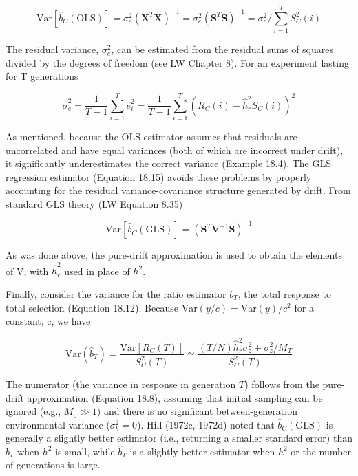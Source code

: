 \documentclass{article}
\begin{document}
\begin{equation}
\mathrm{Var}\left[\widehat{b}_{C}(\mathrm{OLS})\right]=\sigma_{e}^{2}\left(\mathbf{X}^{T}\mathbf{X}\right)^{-1}=\sigma_{e}^{2}\left(\mathbf{S}^{T}\mathbf{S}\right)^{-1}=\sigma_{e}^{2}\bigg/\sum_{i=1}^{T}S_{C}^{2}(i)
\tag{18.16a}
\label{eq:18_16a}
\end{equation}

The residual variance,  $ \sigma_{e}^{2} $, can be estimated from the residual sums of squares divided by the degrees of freedom (see LW Chapter 8). For an experiment lasting for T generations

\begin{equation}
\widehat{\sigma}_{e}^{2}=\frac{1}{T-1}\sum_{i=1}^{T}\widehat{e}_{i}^{2}=\frac{1}{T-1}\sum_{i=1}^{T}\left(R_{C}(i)-\widehat{h}_{r}^{2}S_{C}(i)\right)^{2}
\tag{18.16b}
\label{eq:18_16b}
\end{equation}

As mentioned, because the OLS estimator assumes that residuals are uncorrelated and have equal variances (both of which are incorrect under drift), it significantly underestimates the correct variance (Example 18.4). The GLS regression estimator (Equation 18.15) avoids these problems by properly accounting for the residual variance-covariance structure generated by drift. From standard GLS theory (LW Equation 8.35)

\begin{equation}
\mathrm{Var}\left[\widehat{b}_{C}(\mathrm{GLS})\right]=(\mathbf{S}^{T}\mathbf{V}^{-1}\mathbf{S})^{-1}
\tag{18.17}
\label{eq:18_17}
\end{equation}

As was done above, the pure-drift approximation is used to obtain the elements of V, with  $ \widehat{h}_{r}^{2} $ used in place of  $ h^{2} $.

Finally, consider the variance for the ratio estimator  $ b_T $, the total response to total selection (Equation 18.12). Because  $ \text{Var}(y/c) = \text{Var}(y)/c^2 $ for a constant, c, we have

\begin{equation}
\mathrm{Var}(\widehat{b}_{T})=\frac{\mathrm{Var}\left[R_{C}(T)\right]}{S_{C}^{2}(T)}\simeq\frac{(T/N)\widehat{h}_{r}^{2}\sigma_{z}^{2}+\sigma_{z}^{2}/M_{T}}{S_{C}^{2}(T)}
\tag{18.18}
\label{eq:18_18}
\end{equation}

The numerator (the variance in response in generation $T$) follows from the pure-drift approximation (Equation 18.8), assuming that initial sampling can be ignored (e.g., $M_0 \gg 1$) and there is no significant between-generation environmental variance ($\sigma_b^2 = 0$). Hill (1972c, 1972d) noted that $\widehat{b}_C(\mathrm{GLS})$ is generally a slightly better estimator (i.e., returning a smaller standard error) than $\widehat{b}_T$ when $h^2$ is small, while $\widehat{b}_T$ is a slightly better estimator when $h^2$ or the number of generations is large.
\end{document}

